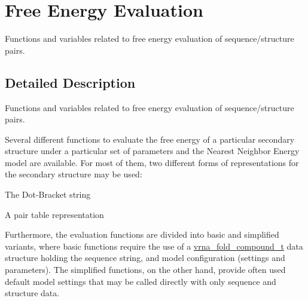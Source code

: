 \hypertarget{group__eval}{}\section{Free Energy Evaluation}
\label{group__eval}


Functions and variables related to free energy evaluation of sequence/structure pairs.  




\subsection{Detailed Description}
Functions and variables related to free energy evaluation of sequence/structure pairs. 

Several different functions to evaluate the free energy of a particular secondary structure under a particular set of parameters and the Nearest Neighbor Energy model are available. For most of them, two different forms of representations for the secondary structure may be used\+:
\begin{DoxyItemize}
\item The Dot-\/\+Bracket string
\item A pair table representation
\end{DoxyItemize}

Furthermore, the evaluation functions are divided into {\ttfamily basic} and {\ttfamily simplified} variants, where {\ttfamily basic} functions require the use of a \hyperlink{group__fold__compound_ga1b0cef17fd40466cef5968eaeeff6166}{vrna\+\_\+fold\+\_\+compound\+\_\+t} data structure holding the sequence string, and model configuration (settings and parameters). The {\ttfamily simplified} functions, on the other hand, provide often used default model settings that may be called directly with only sequence and structure data.

